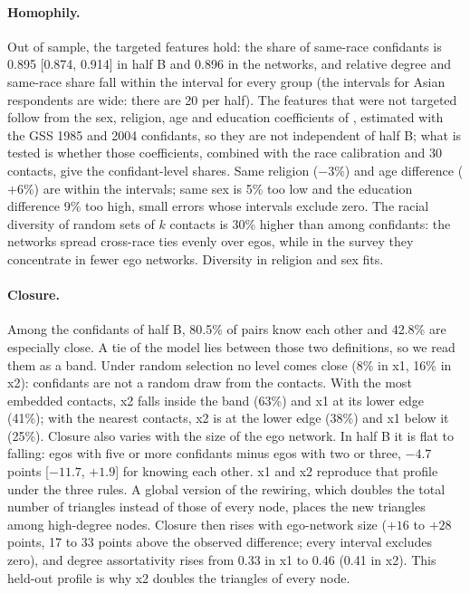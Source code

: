 \paragraph{Homophily.} Out of sample, the targeted features hold: the share of
same-race confidants is 0.895 [0.874, 0.914] in half B and 0.896 in the networks, and
relative degree and same-race share fall within the interval for every group (the
intervals for Asian respondents are wide: there are 20 per half). The features that were
not targeted follow from the sex, religion, age and education coefficients of
\citet{smith2014}, estimated with the GSS 1985 and 2004 confidants, so they are not
independent of half B; what is tested is whether those coefficients, combined with the
race calibration and 30 contacts, give the confidant-level shares. Same religion
($-3\%$) and age difference ($+6\%$) are within the intervals; same sex is 5\% too low
and the education difference 9\% too high, small errors whose intervals exclude zero.
The racial diversity of random sets of $k$ contacts is 30\% higher than among
confidants: the networks spread cross-race ties evenly over egos, while in the survey
they concentrate in fewer ego networks. Diversity in religion and sex fits.

\paragraph{Closure.} Among the confidants of half B, 80.5\% of pairs know each other and
42.8\% are especially close. A tie of the model lies between those two definitions, so
we read them as a band. Under random selection no level comes close (8\% in x1, 16\% in
x2): confidants are not a random draw from the contacts. With the most embedded
contacts, x2 falls inside the band (63\%) and x1 at its lower edge (41\%); with the
nearest contacts, x2 is at the lower edge (38\%) and x1 below it (25\%). Closure also
varies with the size of the ego network. In half B it is flat to falling: egos with five
or more confidants minus egos with two or three, $-4.7$ points [$-11.7$, $+1.9$] for
knowing each other. x1 and x2 reproduce that profile under the three rules. A global
version of the rewiring, which doubles the total number of triangles instead of those of
every node, places the new triangles among high-degree nodes. Closure then rises with
ego-network size ($+16$ to $+28$ points, 17 to 33 points above the observed difference;
every interval excludes zero), and degree assortativity rises from 0.33 in x1 to 0.46
(0.41 in x2). This held-out profile is why x2 doubles the triangles of every node.

